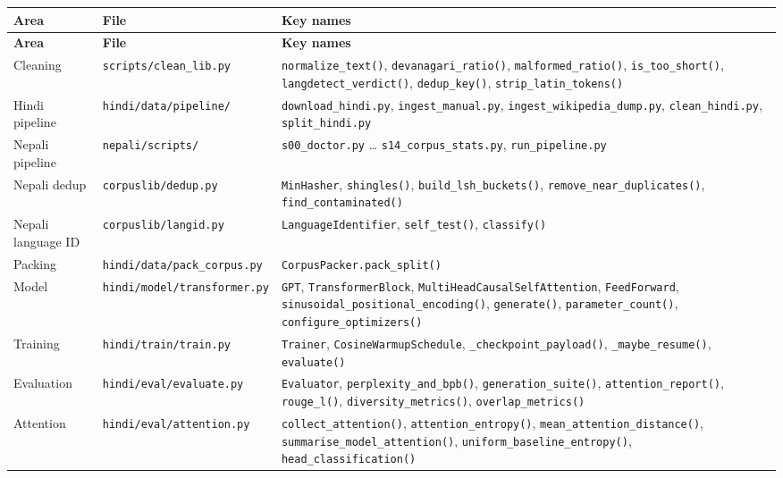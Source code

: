 \documentclass[11pt]{report}
\begin{document}
\begin{longtable}{@{}p{2.6cm}p{4.4cm}p{7.4cm}@{}}
\toprule
\textbf{Area} & \textbf{File} & \textbf{Key names} \\
\midrule
\endfirsthead
\toprule
\textbf{Area} & \textbf{File} & \textbf{Key names} \\
\midrule
\endhead
Cleaning & \texttt{scripts/clean\_lib.py} & \texttt{normalize\_text()}, \texttt{devanagari\_ratio()}, \texttt{malformed\_ratio()}, \texttt{is\_too\_short()}, \texttt{langdetect\_verdict()}, \texttt{dedup\_key()}, \texttt{strip\_latin\_tokens()} \\
Hindi pipeline & \texttt{hindi/data/pipeline/} & \texttt{download\_hindi.py}, \texttt{ingest\_manual.py}, \texttt{ingest\_wikipedia\_dump.py}, \texttt{clean\_hindi.py}, \texttt{split\_hindi.py} \\
Nepali pipeline & \texttt{nepali/scripts/} & \texttt{s00\_doctor.py} \ldots{} \texttt{s14\_corpus\_stats.py}, \texttt{run\_pipeline.py} \\
Nepali dedup & \texttt{corpuslib/dedup.py} & \texttt{MinHasher}, \texttt{shingles()}, \texttt{build\_lsh\_buckets()}, \texttt{remove\_near\_duplicates()}, \texttt{find\_contaminated()} \\
Nepali language ID & \texttt{corpuslib/langid.py} & \texttt{LanguageIdentifier}, \texttt{self\_test()}, \texttt{classify()} \\
Packing & \texttt{hindi/data/pack\_corpus.py} & \texttt{CorpusPacker.pack\_split()} \\
Model & \texttt{hindi/model/transformer.py} & \texttt{GPT}, \texttt{TransformerBlock}, \texttt{MultiHeadCausalSelfAttention}, \texttt{FeedForward}, \texttt{sinusoidal\_positional\_encoding()}, \texttt{generate()}, \texttt{parameter\_count()}, \texttt{configure\_optimizers()} \\
Training & \texttt{hindi/train/train.py} & \texttt{Trainer}, \texttt{CosineWarmupSchedule}, \texttt{\_checkpoint\_payload()}, \texttt{\_maybe\_resume()}, \texttt{evaluate()} \\
Evaluation & \texttt{hindi/eval/evaluate.py} & \texttt{Evaluator}, \texttt{perplexity\_and\_bpb()}, \texttt{generation\_suite()}, \texttt{attention\_report()}, \texttt{rouge\_l()}, \texttt{diversity\_metrics()}, \texttt{overlap\_metrics()} \\
Attention & \texttt{hindi/eval/attention.py} & \texttt{collect\_attention()}, \texttt{attention\_entropy()}, \texttt{mean\_attention\_distance()}, \texttt{summarise\_model\_attention()}, \texttt{uniform\_baseline\_entropy()}, \texttt{head\_classification()} \\

\end{longtable}
\end{document}
